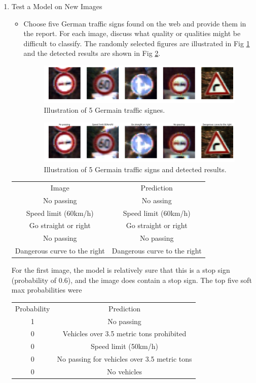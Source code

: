 \documentclass[paper=a4, fontsize=11pt]{scrartcl}
\numberwithin{equation}{section}		%
\numberwithin{figure}{section}			%
\numberwithin{table}{section}				%
\begin{document}
\begin{enumerate}
	\item {Test a Model on New Images}
	\begin{itemize}
	\item {Choose five German traffic signs found on the web and provide them in the report. For each image, discuss what quality or qualities might be difficult to classify.}
	The randomly selected figures are illustrated in Fig \ref{fig:5images} and the detected results are shown in Fig \ref{fig:5imagesresults}.
\begin{figure}
  \centering
  \includegraphics[width=1.0\linewidth]{5images.png}
  \caption{Illustration of 5 Germain traffic signes.}
  \label{fig:5images}
\end{figure} 
\begin{figure}
  \centering
  \includegraphics[width=1.0\linewidth]{5imagesresults.png}
  \caption{Illustration of 5 Germain traffic signs and detected results.}
  \label{fig:5imagesresults}
\end{figure} 
	\end{itemize}
	
	\begin{center}
\begin{tabular}{ c c }
 Image & Prediction\\ 
 No passing & No assing\\ 
 Speed limit (60km/h) & Speed limit (60km/h)\\
 Go straight or right & Go straight or right\\
 No passing & No passing \\
 Dangerous curve to the right & Dangerous curve to the right \\
\end{tabular}
\end{center}

For the first image, the model is relatively sure that this is a stop sign (probability of 0.6), and the image does contain a stop sign. The top five soft max probabilities were
\begin{center}
\begin{tabular}{ c c }
 Probability & Prediction\\ 
1 & No passing\\ 
0 & Vehicles over 3.5 metric tons prohibited\\
0 & Speed limit (50km/h)\\
0 & No passing for vehicles over 3.5 metric tons \\
0 & No vehicles\\
\end{tabular}
\end{center}


\end{enumerate}
\end{document}
